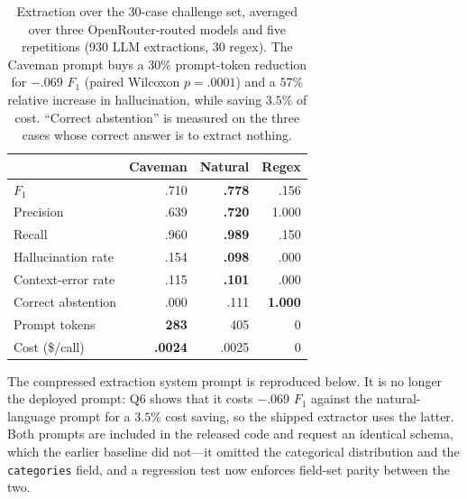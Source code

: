 \begin{table}[t]
\centering
\setlength{\tabcolsep}{4pt}
\begin{tabular}{lrrr}
\toprule
& Caveman & Natural & Regex \\
\midrule
$F_1$                & .710 & \textbf{.778} & .156 \\
Precision            & .639 & \textbf{.720} & 1.000 \\
Recall               & .960 & \textbf{.989} & .150 \\
Hallucination rate   & .154 & \textbf{.098} & .000 \\
Context-error rate   & .115 & \textbf{.101} & .000 \\
Correct abstention   & .000 & .111 & \textbf{1.000} \\
\midrule
Prompt tokens        & \textbf{283} & 405 & 0 \\
Cost (\$/call)       & \textbf{.0024} & .0025 & 0 \\
\bottomrule
\end{tabular}
\caption{Extraction over the 30-case challenge set, averaged over three
OpenRouter-routed models and five repetitions (930 LLM extractions, 30 regex).
The Caveman prompt buys a $30\%$ prompt-token reduction for $-.069$ $F_1$
(paired Wilcoxon $p=.0001$) and a $57\%$ relative increase in hallucination,
while saving $3.5\%$ of cost. ``Correct abstention'' is measured on the three
cases whose correct answer is to extract nothing.}
\label{tab:extraction}
\end{table}



The compressed extraction system prompt is reproduced below. It is no longer the
deployed prompt: Q6 shows that it costs $-.069$ $F_1$ against the natural-language
prompt for a $3.5\%$ cost saving, so the shipped extractor uses the latter. Both
prompts are included in the released code and request an identical schema, which
the earlier baseline did not---it omitted the categorical distribution and the
\texttt{categories} field, and a regression test now enforces field-set parity
between the two.



